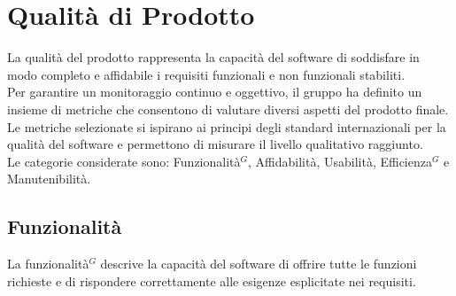 \section{Qualità di Prodotto}
La qualità del prodotto rappresenta la capacità del software di soddisfare in modo completo e affidabile i requisiti funzionali e non funzionali stabiliti.\\
Per garantire un monitoraggio continuo e oggettivo, il gruppo ha definito un insieme di metriche che consentono di valutare diversi aspetti del prodotto finale. Le metriche selezionate si ispirano ai principi degli standard internazionali per la qualità del software e permettono di misurare il livello qualitativo raggiunto.\\
Le categorie considerate sono: Funzionalità$^G$, Affidabilità, Usabilità, Efficienza$^G$ e Manutenibilità.

\subsection{Funzionalità}
La funzionalità$^G$ descrive la capacità del software di offrire tutte le funzioni richieste e di rispondere correttamente alle esigenze esplicitate nei requisiti. 
\begin{table}[h]
    \centering
    \renewcommand{\arraystretch}{1.15}
    \vspace{-0.3cm}
    \caption{Funzionalità del prodotto}
\end{table}


